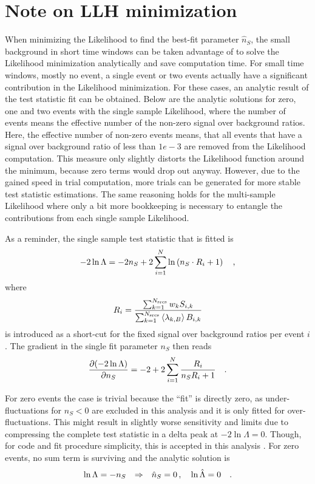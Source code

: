 \section{Note on LLH minimization}
When minimizing the Likelihood to find the best-fit parameter $\hat{n}_S$, the small background in short time windows can be taken advantage of to solve the Likelihood minimization analytically and save computation time.
For small time windows, mostly no event, a single event or two events actually have a significant contribution in the Likelihood minimization.
For these cases, an analytic result of the test statistic fit can be obtained.
Below are the analytic solutions for zero, one and two events with the single sample Likelihood, where the number of events means the effective number of the non-zero signal over background ratios.
Here, the effective number of non-zero events means, that all events that have a signal over background ratio of less than $\si{1e-3}$ are removed from the Likelihood computation.
This measure only slightly distorts the Likelihood function around the minimum, because zero terms would drop out anyway.
However, due to the gained speed in trial computation, more trials can be generated for more stable test statistic estimations.
The same reasoning holds for the multi-sample Likelihood where only a bit more bookkeeping is necessary to entangle the contributions from each single sample Likelihood.

As a reminder, the single sample test statistic that is fitted is
\begin{equation}
  -2\ln\Lambda
  = -2n_S + 2\sum_{i=1}^N \ln\left(n_S \cdot R_i + 1\right)
  \quad\text{,}
\end{equation}
where
\begin{equation}
  R_i = \frac{\sum_{k=1}^{N_\text{srcs}} w_k S_{i,k}}
             {\sum_{k=1}^{N_\text{srcs}}\Braket{\lambda_{k,B}} B_{i,k}}
\end{equation}
is introduced as a short-cut for the fixed signal over background ratios per event $i$.
The gradient in the single fit parameter $n_S$ then reads
\begin{equation}
  \frac{\partial (-2\ln\Lambda)}{\partial n_S}
  = -2 + 2\sum_{i=1}^N \frac{R_i}{n_S R_i + 1}
  \quad\text{.}
\end{equation}

For zero events the case is trivial because the \enquote{fit} is directly zero, as under-fluctuations for $n_S < 0$ are excluded in this analysis and it is only fitted for over-fluctuations.
This might result in slightly worse sensitivity and limits due to compressing the complete test statistic in a delta peak at $-2\ln\Lambda=0$.
Though, for code and fit procedure simplicity, this is accepted in this analysis \cite{Aartsen:2016lir}.
For zero events, no sum term is surviving and the analytic solution is
\begin{equation}
  \ln\Lambda = -n_S
  \quad\text{$\Rightarrow$}\quad
  \hat{n}_S = 0 \, ,\quad \ln\hat{\Lambda} = 0
  \quad\text{.}
\end{equation}

